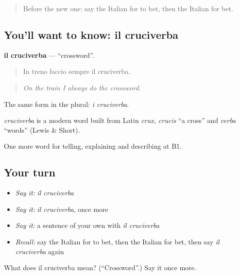 \label{lesson:IT-C504-cruciverba}



\begin{quote}
Before the new one: say the Italian for to bet, then the Italian for bet.
\end{quote}

\subsection*{You'll want to know: il cruciverba}
\textbf{il cruciverba} — \textquotedblleft{}crossword\textquotedblright{}.

\begin{quote}
In treno faccio sempre il cruciverba.
\end{quote}

\begin{quote}
\emph{On the train I always do the crossword.}
\end{quote}

The same form in the plural: \emph{i cruciverba}.

\begin{cousinweb}
\emph{cruciverba} is a modern word built from Latin \emph{crux, crucis} \textquotedblleft{}a cross\textquotedblright{} and \emph{verba} \textquotedblleft{}words\textquotedblright{} (Lewis \& Short).
\end{cousinweb}

\begin{grammarlens}[title={What you've built}]
One more word for telling, explaining and describing at B1.
\end{grammarlens}

\subsection*{Your turn}
\begin{itemize}
\raggedright
  \item \emph{Say it:} \emph{il cruciverba}
  \item \emph{Say it:} \emph{il cruciverba}, once more
  \item \emph{Say it:} a sentence of your own with \emph{il cruciverba}
  \item \emph{Recall:} say the Italian for to bet, then the Italian for bet, then say \emph{il cruciverba} again
\end{itemize}

\begin{tcolorbox}[breakable,colback=teal!4,colframe=teal!35!black,title={Before you move on}]
What does il cruciverba mean? (\textquotedblleft{}Crossword\textquotedblright{}.) Say it once more.
\end{tcolorbox}

